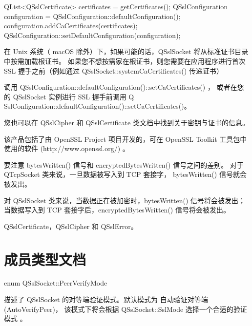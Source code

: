 \begin{cppcode}
 QList<QSslCertificate> certificates = getCertificates();
 QSslConfiguration configuration = QSslConfiguration::defaultConfiguration();
 configuration.addCaCertificates(certificates);
 QSslConfiguration::setDefaultConfiguration(configuration);
\end{cppcode}


\begin{notice}
在 Unix 系统（ macOS 除外）下，如果可能的话，QSslSocket 将从标准证书目录中按需加载根证书。
如果您不想按需家在根证书，则您需要在应用程序进行首次 SSL 握手之前（例如通过 QSslSocket::systemCaCertificates() 传递证书）

调用 QSslConfiguration::defaultConfiguration()::setCaCertificates() ，
或者在您的 QSslSocket 实例进行 SSL 握手前调用 Q
SslConfiguration::defaultConfiguration()::setCaCertificates()。
\end{notice}

您也可以在 QSslCipher 和 QSslCertificate 类文档中找到关于密钥与证书的信息。

该产品包括了由 OpenSSL Project 项目开发的，可在 OpenSSL Toolkit 工具包中使用的软件 (http://www.openssl.org/) 。

\begin{notice}
要注意 bytesWritten() 信号和 encryptedBytesWritten() 信号之间的差别。 
对于 QTcpSocket 类来说，一旦数据被写入到 TCP 套接字， bytesWritten() 信号就会被发出。 

对 QSslSocket 类来说，当数据正在被加密时，bytesWritten() 信号将会被发出；
当数据写入到 TCP 套接字后，encryptedBytesWritten() 信号将会被发出。
\end{notice}

\begin{seeAlso}
QSslCertificate，QSslCipher 和 QSslError。
\end{seeAlso}

\section{成员类型文档}

enum QSslSocket::PeerVerifyMode

描述了 QSslSocket 的对等端验证模式。默认模式为 自动验证对等端 (AutoVerifyPeer)，
该模式下将会根据 QSslSocket::SslMode 选择一个合适的验证模式 。

